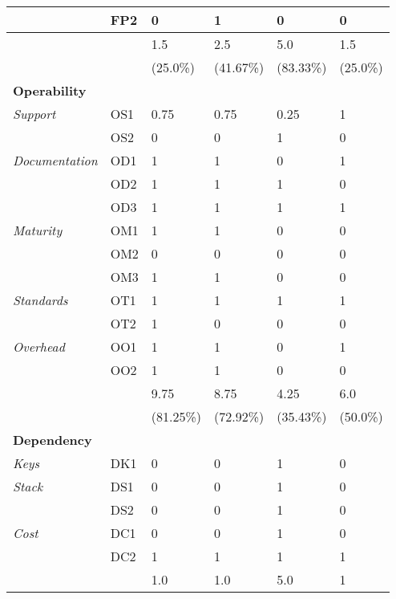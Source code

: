 \begin{longtable}{@{\extracolsep{\fill}}llllll@{}}
                               & FP2 & 0 & 1 & 0 & 0 \\
                               \hline
                               && 1.5 & 2.5 & 5.0 & 1.5 \\
                               && (25.0\%) & (41.67\%) & (83.33\%) & (25.0\%) \\
                               \midrule
        \textbf{Operability} &&&&&\\
        \textit{Support}       & OS1 & 0.75 & 0.75 & 0.25 & 1 \\
                               & OS2 & 0 & 0 & 1 & 0 \\
        \textit{Documentation} & OD1 & 1 & 1 & 0 & 1 \\
                               & OD2 & 1 & 1 & 1 & 0 \\
                               & OD3 & 1 & 1 & 1 & 1 \\
        \textit{Maturity}      & OM1 & 1 & 1 & 0 & 0 \\
                               & OM2 & 0 & 0 & 0 & 0 \\
                               & OM3 & 1 & 1 & 0 & 0 \\
        \textit{Standards}     & OT1 & 1 & 1 & 1 & 1 \\
                               & OT2 & 1 & 0 & 0 & 0 \\
        \textit{Overhead}      & OO1 & 1 & 1 & 0 & 1 \\
                               & OO2 & 1 & 1 & 0 & 0 \\
                               \hline
                               && 9.75 & 8.75 & 4.25 & 6.0 \\
                               && (81.25\%) & (72.92\%) & (35.43\%) & (50.0\%) \\
                               \midrule
        \textbf{Dependency} &&&&&\\
        \textit{Keys}          & DK1 & 0 & 0 & 1 & 0 \\
        \textit{Stack}         & DS1 & 0 & 0 & 1 & 0 \\
                               & DS2 & 0 & 0 & 1 & 0 \\                       
        \textit{Cost}          & DC1 & 0 & 0 & 1 & 0 \\
                               & DC2 & 1 & 1 & 1 & 1 \\     
                               \hline
                               && 1.0 & 1.0 & 5.0 & 1 \\

\end{longtable}
